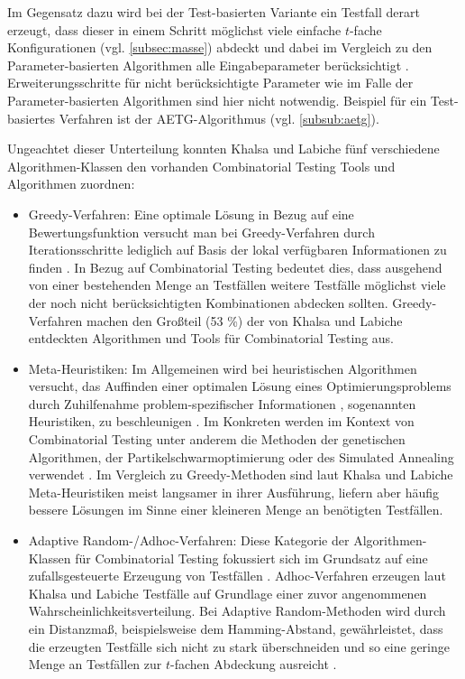 Im Gegensatz dazu wird bei der Test-basierten Variante ein Testfall derart erzeugt, dass dieser in einem Schritt möglichst viele einfache $t$-fache Konfigurationen (vgl. \autoref{subsec:masse}) abdeckt und dabei im Vergleich zu den Parameter-basierten Algorithmen alle Eingabeparameter berücksichtigt \cite{khalsa2014orchestrated}. Erweiterungsschritte für nicht berücksichtigte Parameter wie im Falle der Parameter-basierten Algorithmen sind hier nicht notwendig. Beispiel für ein Test-basiertes Verfahren ist der AETG-Algorithmus (vgl. \autoref{subsub:aetg}). 

Ungeachtet dieser Unterteilung konnten Khalsa und Labiche \cite{khalsa2014orchestrated} fünf verschiedene Algorithmen-Klassen den vorhanden Combinatorial Testing Tools und Algorithmen zuordnen:
\begin{itemize}
\item Greedy-Verfahren: Eine optimale Lösung in Bezug auf eine Bewertungsfunktion versucht man bei Greedy-Verfahren durch Iterationsschritte lediglich auf Basis der lokal verfügbaren Informationen zu finden \cite[S. 185]{schoening2001algorithmik}. In Bezug auf Combinatorial Testing bedeutet dies, dass ausgehend von einer bestehenden Menge an Testfällen weitere Testfälle möglichst viele der noch nicht berücksichtigten Kombinationen abdecken \cite{khalsa2014orchestrated} sollten. Greedy-Verfahren machen den Großteil (53 \%) der von Khalsa und Labiche \cite{khalsa2014orchestrated} entdeckten Algorithmen und Tools für Combinatorial Testing aus.
\item Meta-Heuristiken: Im Allgemeinen wird bei heuristischen Algorithmen versucht, das Auffinden einer optimalen Lösung eines Optimierungsproblems durch Zuhilfenahme \glqq problem-spezifischer Informationen\grqq{} \cite[S. 319]{schoening2001algorithmik}, sogenannten \glqq Heuristiken\grqq{}, zu beschleunigen \cite[S. 319]{schoening2001algorithmik}. Im Konkreten werden im Kontext von Combinatorial Testing unter anderem die Methoden der genetischen Algorithmen, der Partikelschwarmoptimierung oder des Simulated Annealing verwendet \cite{khalsa2014orchestrated}. Im Vergleich zu Greedy-Methoden sind laut Khalsa und Labiche \cite{khalsa2014orchestrated} Meta-Heuristiken meist langsamer in ihrer Ausführung, liefern aber häufig bessere Lösungen im Sinne einer kleineren Menge an benötigten Testfällen.
\item Adaptive Random-/Adhoc-Verfahren: Diese Kategorie der Algorithmen-Klassen für Combinatorial Testing fokussiert sich im Grundsatz auf eine zufallsgesteuerte Erzeugung von Testfällen \cite{khalsa2014orchestrated}. Adhoc-Verfahren erzeugen laut Khalsa und Labiche \cite{khalsa2014orchestrated} Testfälle auf Grundlage einer zuvor angenommenen Wahrscheinlichkeitsverteilung. Bei Adaptive Random-Methoden wird durch ein Distanzmaß, beispielsweise dem Hamming-Abstand, gewährleistet, dass die erzeugten Testfälle sich nicht zu stark überschneiden und so eine geringe Menge an Testfällen zur $t$-fachen Abdeckung ausreicht \cite{khalsa2014orchestrated}. 

\end{itemize}
